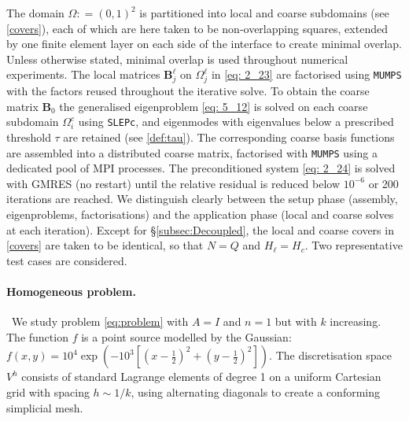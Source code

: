 \documentclass[numbers,webpdf,imaiai]{ima-authoring-template}%
\theoremstyle{thmstyletwo}%
\numberwithin{equation}{section}
\newcommand{\assign}{\mathrel{\mathop:}=}
\numberwithin{equation}{section}
\begin{document}
{The domain $\Omega \assign (0,1)^2$ is partitioned into local and coarse subdomains (see \eqref{covers}), 
each of which are here taken to be non-overlapping squares, extended by one finite element layer on each side of the 
interface to create minimal overlap.  Unless otherwise stated, minimal overlap is used throughout numerical experiments. 
The local matrices $\mathbf{B}^{\ell}_j$  on $\Omega_j^\ell$ in \eqref{eq: 2_23} are factorised using \texttt{MUMPS} 
with the factors reused throughout the iterative solve. 
To obtain the coarse matrix $\mathbf{B}_0$ the generalised eigenproblem \eqref{eq: 5_12} is solved 
on each coarse subdomain $\Omega_i^c$ using \texttt{SLEPc}, and eigenmodes with eigenvalues 
below a prescribed threshold $\tau$ are retained (see \eqref{def:tau}). 
The corresponding coarse basis functions are assembled into a distributed coarse matrix, 
factorised with \texttt{MUMPS} using a dedicated pool of MPI processes. 
The preconditioned system \eqref{eq: 2_24} is solved with GMRES (no restart) until the relative residual is reduced below $10^{-6}$ 
or 200 iterations are reached. We distinguish clearly between the setup phase (assembly, eigenproblems, factorisations) 
and the application phase (local and coarse solves at each iteration). 
Except for \S \ref{subsec:Decoupled}, the local and coarse  covers in \eqref{covers} are taken to be identical, 
so that $N=Q$ and $H_\ell = H_c$. Two representative test cases are considered.

\paragraph{Homogeneous problem.}\, 
We study problem \eqref{eq:problem} with $A = I$ and $n=1$ but with  $k$ increasing. 
The  function $f$ is a  point source  modelled by the  Gaussian:
\(f(x,y)=10^4 \exp(-10^3[(x-\frac{1}{2})^2+(y-\frac{1}{2})^2])\). The discretisation space $V^h$ consists of standard Lagrange elements 
of degree 1 on a uniform Cartesian grid with spacing $h \sim 1/k$, using alternating diagonals to create a conforming simplicial mesh. 

}
\end{document}

